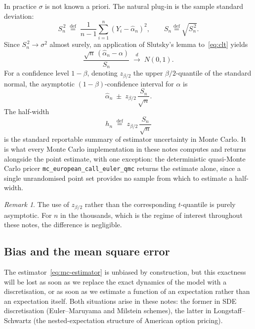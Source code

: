 \documentclass[11pt,a4paper]{article}
\theoremstyle{plain}
\theoremstyle{definition}
\theoremstyle{remark}
\newtheorem{remark}[theorem]{Remark}
\newcommand{\eqdef}{\overset{\mathrm{def}}{=}}
\begin{document}
In practice $\sigma$ is not known a priori. The natural plug-in is the
sample standard deviation:
\begin{equation}
\label{eq:sample-variance}
S_n^{\,2} \;\eqdef\; \frac{1}{n-1}\sum_{i=1}^{n}(Y_i - \hat{\alpha}_n)^2,
\qquad
S_n \eqdef \sqrt{S_n^{\,2}}.
\end{equation}
Since $S_n^{\,2} \to \sigma^2$ almost surely, an application of
Slutsky's lemma to~\eqref{eq:clt} yields
\begin{equation}
\label{eq:studentised}
\frac{\sqrt{n}\,(\hat{\alpha}_n - \alpha)}{S_n}
\;\xrightarrow{\;d\;}\; N(0,1).
\end{equation}
For a confidence level $1-\beta$, denoting $z_{\beta/2}$ the upper
$\beta/2$-quantile of the standard normal, the asymptotic
$(1-\beta)$-confidence interval for $\alpha$ is
\begin{equation}
\label{eq:ci}
\hat{\alpha}_n \;\pm\; z_{\beta/2}\,\frac{S_n}{\sqrt{n}}.
\end{equation}
The half-width
\begin{equation}
\label{eq:halfwidth}
h_n \;\eqdef\; z_{\beta/2}\,\frac{S_n}{\sqrt{n}}
\end{equation}
is the standard reportable summary of estimator uncertainty in Monte
Carlo. It is what every Monte Carlo implementation in these notes computes and
returns alongside the point estimate, with one exception: the
deterministic quasi-Monte Carlo pricer
\texttt{mc\_european\_call\_euler\_qmc} returns the estimate alone,
since a single unrandomised point set provides no sample from which to
estimate a half-width.

\begin{remark}
The use of $z_{\beta/2}$ rather than the corresponding $t$-quantile is
purely asymptotic. For $n$ in the thousands, which is the regime of
interest throughout these notes, the difference is negligible.
\end{remark}

\subsection{Bias and the mean square error}
\label{sec:mse}

The estimator~\eqref{eq:mc-estimator} is unbiased by construction, but
this exactness will be lost as soon as we replace the exact dynamics of
the model with a discretisation, or as soon as we estimate a function of
an expectation rather than an expectation itself. Both situations arise
in these notes: the former in SDE discretisation (Euler--Maruyama and Milstein
schemes), the latter in Longstaff--Schwartz (the nested-expectation
structure of American option pricing).
\end{document}

